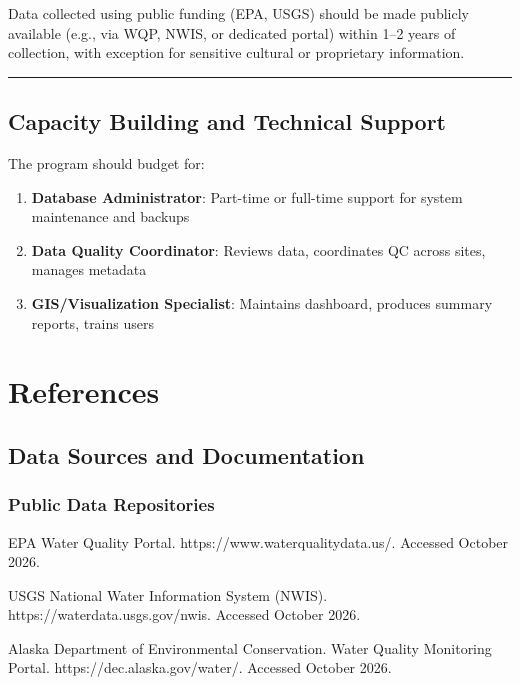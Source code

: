 \documentclass[
  letterpaper,
]{scrbook}
\providecommand{\tightlist}{%
  \setlength{\itemsep}{0pt}\setlength{\parskip}{0pt}}\usepackage{longtable,booktabs,array}
\begin{document}
Data collected using public funding (EPA, USGS) should be made publicly
available (e.g., via WQP, NWIS, or dedicated portal) within 1--2 years
of collection, with exception for sensitive cultural or proprietary
information.

\begin{center}\rule{0.5\linewidth}{0.5pt}\end{center}

\section{Capacity Building and Technical
Support}\label{capacity-building-and-technical-support}

The program should budget for:

\begin{enumerate}
\def\labelenumi{\arabic{enumi}.}
\tightlist
\item
  \textbf{Database Administrator}: Part-time or full-time support for
  system maintenance and backups
\item
  \textbf{Data Quality Coordinator}: Reviews data, coordinates QC across
  sites, manages metadata
\item
  \textbf{GIS/Visualization Specialist}: Maintains dashboard, produces
  summary reports, trains users
\end{enumerate}


\chapter{References}\label{references}

\section{Data Sources and
Documentation}\label{data-sources-and-documentation}

\subsection{Public Data Repositories}\label{public-data-repositories-1}

EPA Water Quality Portal. https://www.waterqualitydata.us/. Accessed
October 2026.

USGS National Water Information System (NWIS).
https://waterdata.usgs.gov/nwis. Accessed October 2026.

Alaska Department of Environmental Conservation. Water Quality
Monitoring Portal. https://dec.alaska.gov/water/. Accessed October 2026.
\end{document}
